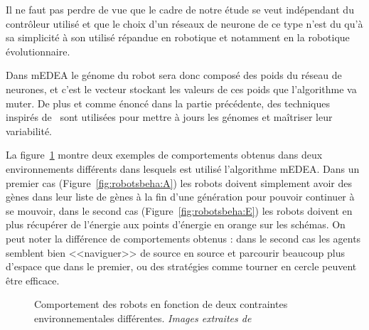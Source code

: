 \documentclass[a4paper,10pt]{report}
\begin{document}
Il ne faut pas perdre de vue que le cadre de notre étude se veut indépendant du contrôleur utilisé et que le choix d'un réseaux de neurone de ce type n'est du qu'à sa simplicité à son utilisé répandue en robotique et notamment en la robotique évolutionnaire.

Dans mEDEA le génome du robot sera donc composé des poids du réseau de neurones, et c'est le vecteur stockant les valeurs de ces poids que l'algorithme va muter. De plus et comme énoncé dans la partie précédente, des techniques inspirés de~\cite{Beyer2002Evolution-strat} sont utilisées pour mettre à jours les génomes et maîtriser leur variabilité.

La figure~\ref{fig:robotsbeha} montre deux exemples de comportements obtenus dans deux environnements différents dans lesquels est utilisé l'algorithme mEDEA. Dans un premier cas (Figure~\ref{fig:robotsbeha:A}) les robots doivent simplement avoir des gènes dans leur liste de gènes à la fin d'une génération pour pouvoir continuer à se mouvoir, dans le second cas (Figure~\ref{fig:robotsbeha:E}) les robots doivent en plus récupérer de l'énergie aux points d'énergie en orange sur les schémas. On peut noter la différence de comportements obtenus : dans le second cas les agents semblent bien <<naviguer>> de source en source et parcourir beaucoup plus d'espace que dans le premier, ou des stratégies comme tourner en cercle peuvent être efficace. 

\begin{figure}[H]
\centering


\caption[Visualisation du comportement des robots]{Comportement des robots en fonction de deux contraintes environnementales différentes. \emph{Images extraites de~\cite{bredeche11mcmds}}}
\label{fig:robotsbeha}

\end{figure}
\end{document}
